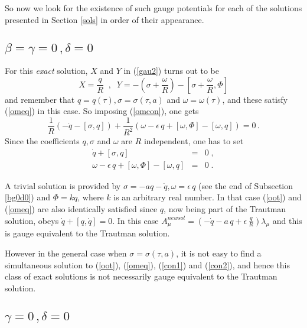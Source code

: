 \documentclass[a4paper,twocolumn,prd,showpacs,amsmath,amssymb]{revtex4}
\begin{document}
So now we look for the existence of such gauge potentials for each of the
solutions presented in Section \ref{sols} in order of their appearance.

\subsection{\label{gbg0d0} $\beta=\gamma=0 \, , \delta=0$}

For this {\it exact} solution, $X$ and $Y$ in (\ref{gau2}) turns out to be
\[ X = \frac{q}{R} \;\; , \;\; Y = - (\sigma + \frac{\omega}{R})
- [\sigma + \frac{\omega}{R},\Phi] \]
and remember that $q=q(\tau), \sigma=\sigma(\tau,a)$ and $\omega=\omega(\tau)$,
and these satisfy (\ref{omeq}) in this case. So imposing (\ref{omcon}), one gets
\[ \frac{1}{R} (- \dot{q} - [\sigma,q])
+ \frac{1}{R^2} (\omega - \epsilon \, q + [\omega,\Phi] - [\omega,q]) = 0 \, . \]
Since the coefficients $q,\sigma$ and $\omega$ are $R$ independent, one has to set
\begin{eqnarray}
\dot{q} + [\sigma,q] & = & 0 \; , \label{con1} \\
\omega - \epsilon \, q + [\omega,\Phi] - [\omega,q] & = & 0 \; . \label{con2}
\end{eqnarray}

A trivial solution is provided by $\sigma = - a q - \dot{q}, \omega= \epsilon \, q$
(see the end of Subsection \ref{bg0d0}) and $\Phi=k q$, where $k$ is an arbitrary
real number. In that case (\ref{oot}) and (\ref{omeq}) are also identically
satisfied since $q$, now being part of the Trautman solution, obeys
$\dot{q} + [q,\dot{q}]=0$. In this case \( A_{\mu}^{new sol} =
(-\dot{q} - a \, q + \epsilon \, \frac{q}{R}) \lambda_{\mu} \) and
this is gauge equivalent to the Trautman solution.

However in the general case when $\sigma=\sigma(\tau,a)$, it is not easy to find
a simultaneous solution to (\ref{oot}), (\ref{omeq}), (\ref{con1}) and (\ref{con2}),
and hence this class of exact solutions is not necessarily gauge equivalent to the
Trautman solution.

\subsection{\label{gg0d0} $\gamma=0 \, , \delta=0$}
\end{document}
